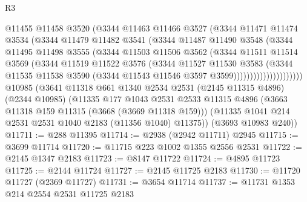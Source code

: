 \begin{lexlean}{R3}
\begin{coremodule}
                        @11455
                        @11458
                        @3520
                        (@3344
                          @11463
                          @11466
                          @3527
                          (@3344
                            @11471
                            @11474
                            @3534
                            (@3344
                              @11479
                              @11482
                              @3541
                              (@3344
                                @11487
                                @11490
                                @3548
                                (@3344
                                  @11495
                                  @11498
                                  @3555
                                  (@3344
                                    @11503
                                    @11506
                                    @3562
                                    (@3344
                                      @11511
                                      @11514
                                      @3569
                                      (@3344
                                        @11519
                                        @11522
                                        @3576
                                        (@3344
                                          @11527
                                          @11530
                                          @3583
                                          (@3344
                                            @11535
                                            @11538
                                            @3590
                                            (@3344 @11543 @11546 @3597 @3599)))))))))))))))))))))
    @10985
    (@3641
      @11318
      @661
      @1340
      @2534
      @2531
      (@2145 @11315 @4896)
      (@2344 @10985)
      (@11335
        @177
        @1043
        @2531
        @2533
        @11315
        @4896
        (@3663 @11318 @159 @11315 (@3668 (@3669 @11318 @159)))
        (@11335 @1041 @214 @2531 @2531 @1040 @2183 (@11356 @1040) @11375))
      (@3693 @10983 @240))
@11711 := @288 @11395
@11714 := @2938 (@2942 @11711) @2945
@11715 := @3699 @11714
@11720 := @11715 @223 @1002 @1355 @2556 @2531
@11722 := @2145 @1347 @2183
@11723 := @8147 @11722
@11724 := @4895 @11723
@11725 := @2144 @11724
@11727 := @2145 @11725 @2183
@11730 := @11720 @11727 (@2369 @11727)
@11731 := @3654 @11714
@11737 := @11731 @1353 @214 @2554 @2531 @11725 @2183

\end{coremodule}
\end{lexlean}
